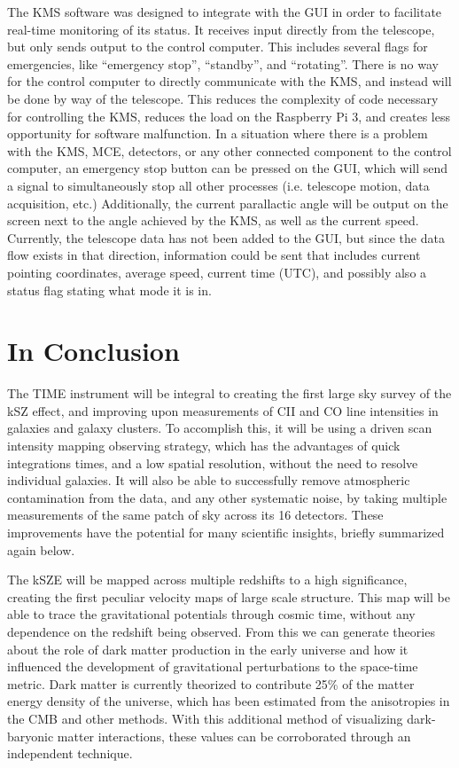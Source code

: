 \documentclass[manuscript]{aastex}
\begin{document}
The KMS software was designed to integrate with the GUI in order to facilitate real-time monitoring of its status. It receives input directly from the telescope, but only sends output to the control computer. This includes several flags for emergencies, like ``emergency stop'', ``standby'', and ``rotating''. There is no way for the control computer to directly communicate with the KMS, and instead will be done by way of the telescope. This reduces the complexity of code necessary for controlling the KMS, reduces the load on the Raspberry Pi 3, and creates less opportunity for software malfunction. In a situation where there is a problem with the KMS, MCE, detectors, or any other connected component to the control computer, an emergency stop button can be pressed on the GUI, which will send a signal to simultaneously stop all other processes (i.e. telescope motion, data acquisition, etc.) Additionally, the current parallactic angle will be output on the screen next to the angle achieved by the KMS, as well as the current speed. Currently, the telescope data has not been added to the GUI, but since the data flow exists in that direction, information could be sent that includes current pointing coordinates, average speed, current time (UTC), and possibly also a status flag stating what mode it is in. 



\section{In Conclusion}

The TIME instrument will be integral to creating the first large sky survey of the kSZ effect, and improving upon measurements of CII and CO line intensities in galaxies and galaxy clusters. To accomplish this, it will be using a driven scan intensity mapping observing strategy, which has the advantages of quick integrations times, and a low spatial resolution, without the need to resolve individual galaxies. It will also be able to successfully remove atmospheric contamination from the data, and any other systematic noise, by taking multiple measurements of the same patch of sky across its 16 detectors. These improvements have the potential for many scientific insights, briefly summarized again below.

The kSZE will be mapped across multiple redshifts to a high significance, creating the first peculiar velocity maps of large scale structure. This map will be able to trace the gravitational potentials through cosmic time, without any dependence on the redshift being observed. From this we can generate theories about the role of dark matter production in the early universe and how it influenced the development of gravitational perturbations to the space-time metric. Dark matter is currently theorized to contribute 25\% of the matter energy density of the universe, which has been estimated from the anisotropies in the CMB and other methods. With this additional method of visualizing dark-baryonic matter interactions, these values can be corroborated through an independent technique. 
\end{document}
